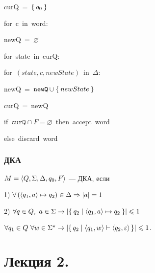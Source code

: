 \begin{lyxcode}
  curQ~=~$\Set{ q_{0}} $

  for~c~in~word:
	\begin{lyxcode}
	newQ~=~$\varnothing$

	for~state~in~curQ:
	  \begin{lyxcode}
	  for~$\left(state,c,newState\right)$~in~$\Delta$:
		\begin{lyxcode}
		  newQ~=~$\mathtt{newQ}\cup\Set{newState} $
		\end{lyxcode}
	  \end{lyxcode}
	curQ~=~newQ
	\end{lyxcode}
  if~$\mathtt{curQ} \cap F=\varnothing$~then~accept~word

  else~discard~word
\end{lyxcode}

\section{ДКА}
\begin{define*}
$M=\Braket{ Q,\Sigma,\Delta,q_{0},F} $ --- ДКА, если

1) $\forall\left(\Braket{ q_{1},a} \mapsto q_{2}\right)\in\Delta\Rightarrow\left\lvert a \right\rvert=1$

2) $\forall q\in Q,\ a\in\Sigma\rightarrow\abs{\Set{ q_{2}|\Braket{ q_{1},a} \mapsto q_{2}} }\le1$\end{define*}
\begin{claim*}
$\forall q_{1}\in Q\ \forall w\in\Sigma^{\star}\rightarrow\left\lvert \set{ q_{2}|\Braket{ q_{1},w} \vdash\Braket{ q_{2},\varepsilon} }  \right\rvert\leqslant1$.\end{claim*}


\part*{Лекция 2. }

